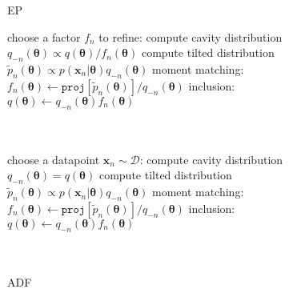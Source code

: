 \begin{figure}[!t]
\begin{minipage}[t]{0.33\linewidth}
\centering
\begin{algorithm}[H] 
\caption{EP} \small
\label{alg:ep} 
\begin{algorithmic}[1] 
	\STATE choose a factor $f_n$ to refine:
	\STATE compute cavity distribution \\$q_{-n}(\bm{\theta}) \propto q(\bm{\theta}) / f_n(\bm{\theta})$ 
	\STATE compute tilted distribution \\$\tilde{p}_n(\bm{\theta}) \propto p(\bm{x}_n|\bm{\theta}) q_{-n}(\bm{\theta})$
	\STATE moment matching: \\ \hspace{-1mm}$f_n(\bm{\theta}) \leftarrow \mathtt{proj}[\tilde{p}_n(\bm{\theta})] / q_{-n}(\bm{\theta}) $
	\STATE inclusion:\\ $q(\bm{\theta}) \leftarrow q_{-n}(\bm{\theta}) f_n(\bm{\theta})$\\\hspace{1mm}\\ \vspace{1.5mm} \hspace{1mm}\\
\end{algorithmic}
\end{algorithm}
\end{minipage}
%
\begin{minipage}[t]{0.33\linewidth}
\centering
\begin{algorithm}[H] 
\caption{ADF} \small
\label{alg:adf} 
\begin{algorithmic}[1] 
	\STATE choose a datapoint $\bm{x}_n\sim \mathcal{D}$:
	\STATE compute cavity distribution \\$q_{-n}(\bm{\theta}) = q(\bm{\theta})$
	\STATE compute tilted distribution \\$\tilde{p}_n(\bm{\theta}) \propto p(\bm{x}_n|\bm{\theta}) q_{-n}(\bm{\theta})$
	\STATE moment matching: \\ \hspace{-1mm}$f_n(\bm{\theta}) \leftarrow \mathtt{proj}[\tilde{p}_n(\bm{\theta})] / q_{-n}(\bm{\theta}) $
	\STATE inclusion:\\ $q(\bm{\theta}) \leftarrow q_{-n}(\bm{\theta}) f_n(\bm{\theta})$\\\hspace{1mm}\\ \vspace{1.5mm} \hspace{1mm}\\

\end{algorithmic}
\end{algorithm}
\end{minipage}
\end{figure}
